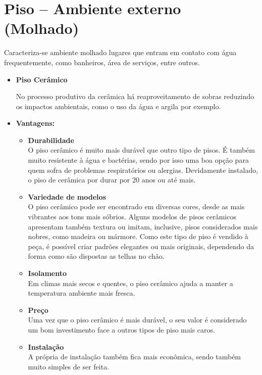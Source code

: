 \section{Piso – Ambiente externo (Molhado)}
	Caracteriza-se ambiente molhado lugares que entram em contato com água frequentemente, como banheiros, área de serviços, entre outros.

\begin{itemize}

\item \textbf{Piso Cerâmico}

	No processo produtivo da cerâmica há reaproveitamento de sobras reduzindo os impactos ambientais, como o uso da água e argila por exemplo.

\item \textbf{Vantagens:}
\begin{itemize}
\item \textbf{Durabilidade}\\O piso cerâmico é muito mais durável que outro tipo de pisos. É também muito resistente à água e bactérias, sendo por isso uma boa opção para quem sofra de problemas respiratórios ou alergias. Devidamente instalado, o piso de cerâmica por durar por 20 anos ou até mais.

\item \textbf{Variedade de modelos}\\O piso cerâmico pode ser encontrado em diversas cores, desde as mais vibrantes aos tons mais sóbrios. Alguns modelos de pisos cerâmicos apresentam também textura ou imitam, inclusive, pisos considerados mais nobres, como madeira ou mármore. Como este tipo de piso é vendido à peça, é possível criar padrões elegantes ou mais originais, dependendo da forma como são dispostas as telhas no chão.

\item \textbf{Isolamento}\\Em climas mais secos e quentes, o piso cerâmico ajuda a manter a temperatura ambiente mais fresca.

\item \textbf{Preço}\\Uma vez que o piso cerâmico é mais durável, o seu valor é considerado um bom investimento face a outros tipos de piso mais caros.

\item \textbf{Instalação}\\A própria de instalação também fica mais econômica, sendo também muito simples de ser feita.


\end{itemize}
\end{itemize}
